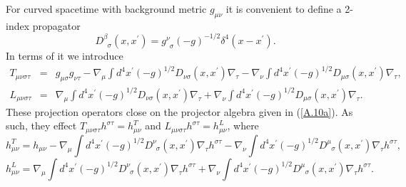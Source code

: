 \documentclass[aps,onecolumn,10pt]{revtex4}
\numberwithin{equation}{section}
\numberwithin{equation}{section}
\begin{document}
For curved spacetime with background metric $g_{\mu\nu}$ it is convenient to  define a 2-index propagator
%
\begin{equation} 
[g^{\nu}_{\phantom{\nu}\beta}\nabla_{\tau}\nabla^{\tau}
+\nabla_{\beta}\nabla^{\nu}]D^{\beta}_{\phantom{\beta}\sigma}
(x,x^{\prime}) =g^{\nu}_{\phantom{\nu}\sigma}(-g)^{-1/2}\delta^4
(x-x^{\prime}).
\label{A.31a}
\end{equation}
%
In terms of it we introduce \cite{Mannheim2005}
% 
 \begin{eqnarray} 
T_{\mu\nu\sigma\tau}&=&g_{\mu\sigma}g_{\nu\tau}- \nabla_{\mu}\int
d^4x^{\prime}(-g)^{1/2}
D_{\nu\sigma}(x,x^{\prime})
\nabla_{\tau} 
-\nabla_{\nu}\int
d^4x^{\prime}(-g)^{1/2}
D_{\mu\sigma}(x,x^{\prime})\nabla_{\tau},
\nonumber \\
L_{\mu\nu\sigma\tau}&=&\nabla_{\mu}\int
d^4x^{\prime}(-g)^{1/2}
D_{\nu\sigma}(x,x^{\prime})
\nabla_{\tau} 
+\nabla_{\nu}\int
d^4x^{\prime}(-g)^{1/2}
D_{\mu\sigma}(x,x^{\prime})
\nabla_{\tau}.
\label{A.32a}
\end{eqnarray}
%
These projection operators close on the projector algebra given in (\ref{A.10a}). As such, they effect
 $T_{\mu\nu\sigma\tau}h^{\sigma\tau}=
h^{T}_{\mu\nu}$ and $L_{\mu\nu\sigma\tau}h^{\sigma\tau}=
h^{L}_{\mu\nu}$, where
%
\begin{equation} 
h^{T}_{\mu\nu}=h_{\mu\nu}-\nabla_{\mu}\int
d^4x^{\prime}(-g)^{1/2}
D^{\nu}_{\phantom{\nu}\sigma}(x,x^{\prime})
\nabla_{\tau}h^{\sigma\tau}  
-\nabla_{\nu}\int
d^4x^{\prime}(-g)^{1/2}
D^{\mu}_{\phantom{\mu}\sigma}(x,x^{\prime})
\nabla_{\tau}h^{\sigma\tau},
\label{A.33a}
\end{equation}
% 
%
\begin{equation} 
h^{L}_{\mu\nu}=\nabla_{\mu}\int
d^4x^{\prime}(-g)^{1/2}
D^{\nu}_{\phantom{\nu}\sigma}(x,x^{\prime})
\nabla_{\tau}h^{\sigma\tau} 
+\nabla_{\nu}\int
d^4x^{\prime}(-g)^{1/2}
D^{\mu}_{\phantom{\mu}\sigma}(x,x^{\prime})
\nabla_{\tau}h^{\sigma\tau}.
\label{A.34a}
\end{equation}
% 
\end{document}
